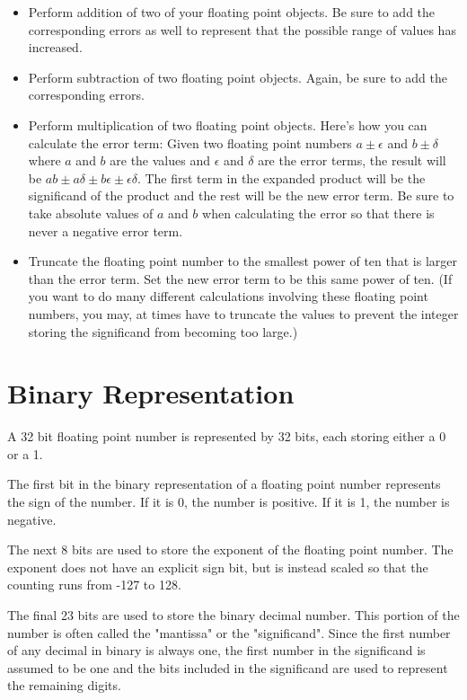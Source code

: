 \begin{problem}
\begin{itemize}
\begin{itemize}
	\item Perform addition of two of your floating point objects.
		Be sure to add the corresponding errors as well to represent that the possible range of values has increased.

	\item Perform subtraction of two floating point objects.
		Again, be sure to add the corresponding errors.

	\item Perform multiplication of two floating point objects.
		Here's how you can calculate the error term:
		Given two floating point numbers $a\pm\epsilon$ and $b\pm\delta$ where $a$ and $b$ are the values and $\epsilon$ and $\delta$ are the error terms, the result will be $ab \pm a\delta \pm b\epsilon \pm \epsilon\delta$.
		The first term in the expanded product will be the significand of the product and the rest will be the new error term.
		Be sure to take absolute values of $a$ and $b$ when calculating the error so that there is never a negative error term.

	\item Truncate the floating point number to the smallest power of ten that is larger than the error term.
		Set the new error term to be this same power of ten.
		(If you want to do many different calculations involving these floating point numbers, you may, at times have to truncate the values to prevent the integer storing the significand from becoming too large.)

	\end{itemize}

\end{itemize}
\end{problem}

\section*{Binary Representation}
A 32 bit floating point number is represented by 32 bits, each storing either a 0 or a 1.

The first bit in the binary representation of a floating point number represents the sign of the number.
If it is 0, the number is positive.
If it is 1, the number is negative.

The next 8 bits are used to store the exponent of the floating point number.
The exponent does not have an explicit sign bit, but is instead scaled so that the counting runs from -127 to 128.

The final 23 bits are used to store the binary decimal number.
This portion of the number is often called the "mantissa" or the "significand".
Since the first number of any decimal in binary is always one, the first number in the significand is assumed to be one and the bits included in the significand are used to represent the remaining digits.

